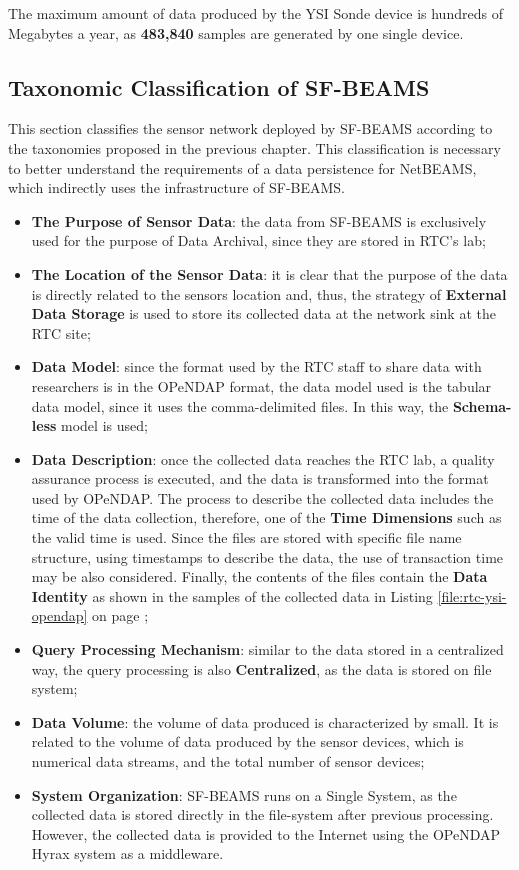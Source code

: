 The maximum amount of data produced by the YSI Sonde device is hundreds of Megabytes
a year, as \textbf{483,840} samples are generated by one single device. 

\subsection{Taxonomic Classification of SF-BEAMS}

This section classifies the sensor network deployed by SF-BEAMS according to
the taxonomies proposed in the previous chapter. This classification is
necessary to better understand the requirements of a data persistence for
NetBEAMS, which indirectly uses the infrastructure of SF-BEAMS.

\begin{itemize}
  \item \textbf{The Purpose of Sensor Data}: the data from SF-BEAMS is exclusively
  used for the purpose of Data Archival, since they are stored in RTC's lab;
  \item \textbf{The Location of the Sensor Data}: it is clear that the purpose
  of the data is directly related to the sensors location and, thus, the
  strategy of \textbf{External Data Storage} is used to store its collected
  data at the network sink at the RTC site;
  \item \textbf{Data Model}: since the format used by the RTC staff to share
  data with researchers is in the OPeNDAP format, the data
  model used is the tabular data model, since it uses the comma-delimited
  files. In this way, the \textbf{Schema-less} model is used;
  \item \textbf{Data Description}: once the collected data reaches the RTC
  lab, a quality assurance process is executed, and the data is transformed
  into the format used by OPeNDAP. The process to describe the collected data
  includes the time of the data collection, therefore, one of the \textbf{Time
  Dimensions} such as the valid time is used. Since the files are stored with
  specific file name structure, using timestamps to describe the data, the use
  of transaction time may be also considered. Finally, the contents of the
  files contain the \textbf{Data Identity} as shown in the samples of the
  collected data in Listing \ref{file:rtc-ysi-opendap} on page
  \pageref{file:rtc-ysi-opendap};
  \item \textbf{Query Processing Mechanism}: similar to the data stored in a
  centralized way, the query processing is also \textbf{Centralized}, as the
  data is stored on file system;
  \item \textbf{Data Volume}: the volume of data produced is characterized by small.
 It is related to the volume of data produced by the sensor devices,
  which is numerical data streams, and the total number of sensor devices;
  \item \textbf{System Organization}: SF-BEAMS runs on a Single System, as
  the collected data is stored directly in the file-system after previous 
  processing. However, the collected data is provided to the Internet using
  the OPeNDAP Hyrax system as a middleware.
\end{itemize}

